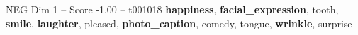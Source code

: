 \begin{textsample}{NEG Dim 1 – Score -1.00 – t001018}  \label{ex:f1_neg_029}
\textbf{happiness}, \textbf{facial\_expression}, tooth, \textbf{smile}, \textbf{laughter}, pleased, \textbf{photo\_caption}, comedy, tongue, \textbf{wrinkle}, surprise

\end{textsample}
